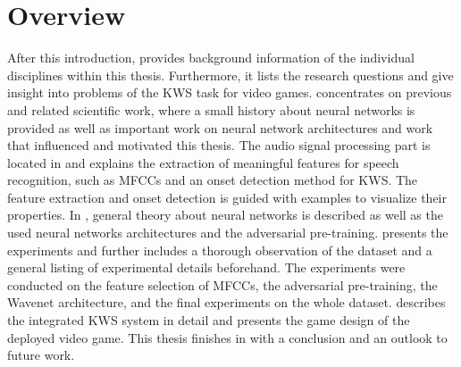 
\section{Overview}\label{sec:intro_overview}
After this introduction,  provides background information of the individual disciplines within this thesis.
Furthermore, it lists the research questions and give insight into problems of the KWS task for video games.
 concentrates on previous and related scientific work, where a small history about neural networks is provided as well as important work on neural network architectures and work that influenced and motivated this thesis.
The audio signal processing part is located in  and explains the extraction of meaningful features for speech recognition, such as MFCCs and an onset detection method for KWS.
The feature extraction and onset detection is guided with examples to visualize their properties.
In , general theory about neural networks is described as well as the used neural networks architectures and the adversarial pre-training.
 presents the experiments and further includes a thorough observation of the dataset and a general listing of experimental details beforehand.
The experiments were conducted on the feature selection of MFCCs, the adversarial pre-training, the Wavenet architecture, and the final experiments on the whole dataset.
 describes the integrated KWS system in detail and presents the game design of the deployed video game.
This thesis finishes in  with a conclusion and an outlook to future work.
